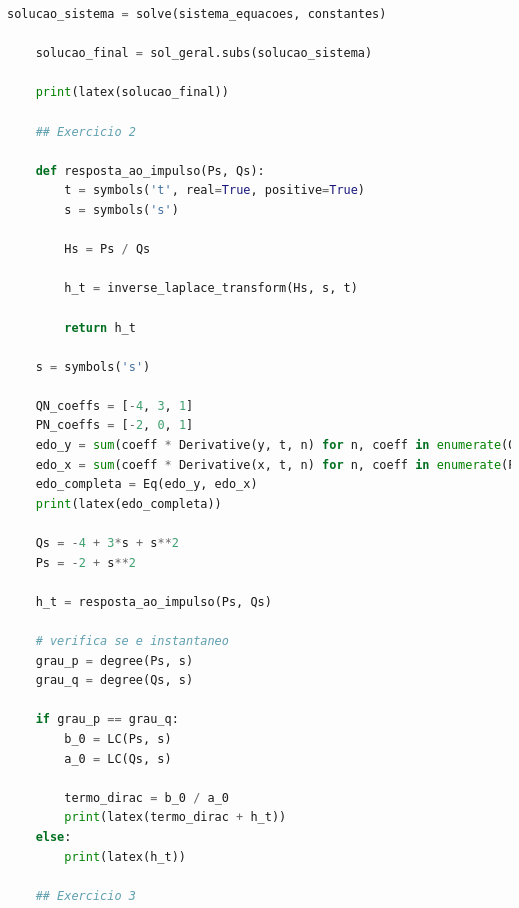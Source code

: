 \documentclass[12pt]{scrartcl}
\begin{document}
\begin{lstlisting}[language=Python, breaklines=true, basicstyle=\scriptsize]
    solucao_sistema = solve(sistema_equacoes, constantes)

    solucao_final = sol_geral.subs(solucao_sistema)

    print(latex(solucao_final))

    ## Exercicio 2

    def resposta_ao_impulso(Ps, Qs):
        t = symbols('t', real=True, positive=True)
        s = symbols('s')

        Hs = Ps / Qs

        h_t = inverse_laplace_transform(Hs, s, t)

        return h_t

    s = symbols('s')

    QN_coeffs = [-4, 3, 1]
    PN_coeffs = [-2, 0, 1]
    edo_y = sum(coeff * Derivative(y, t, n) for n, coeff in enumerate(QN_coeffs))
    edo_x = sum(coeff * Derivative(x, t, n) for n, coeff in enumerate(PN_coeffs))
    edo_completa = Eq(edo_y, edo_x)
    print(latex(edo_completa))

    Qs = -4 + 3*s + s**2
    Ps = -2 + s**2

    h_t = resposta_ao_impulso(Ps, Qs)

    # verifica se e instantaneo
    grau_p = degree(Ps, s)
    grau_q = degree(Qs, s)

    if grau_p == grau_q:
        b_0 = LC(Ps, s)
        a_0 = LC(Qs, s)

        termo_dirac = b_0 / a_0
        print(latex(termo_dirac + h_t))
    else:
        print(latex(h_t))

    ## Exercicio 3
\end{lstlisting}
\end{document}
